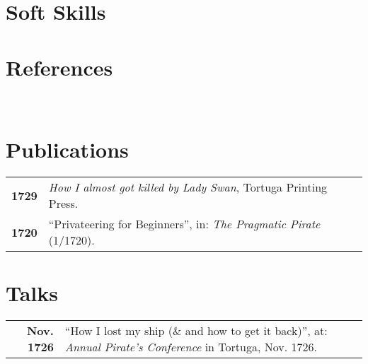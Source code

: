 \documentclass[AdrianConfig]{hipstercv}
\begin{document}
\begin{paracol}{2}
\begin{minipage}[t]{0.3\textwidth}
\section*{Soft Skills}
\section*{References}
 \\

\end{minipage}\hfill
\begin{minipage}[t]{0.3\textwidth}
\section*{Publications}
\begin{tabular}{>{\footnotesize\bfseries}r >{\footnotesize}p{}}
    1729 & \emph{How I almost got killed by Lady Swan}, Tortuga Printing Press. \\
    1720 & ``Privateering for Beginners'', in: \emph{The Pragmatic Pirate} (1/1720).
\end{tabular}
\section*{Talks}
\begin{tabular}{>{\footnotesize\bfseries}r >{\footnotesize}p{}}
    Nov. 1726 & ``How I lost my ship (\& and how to get it back)'', at: \emph{Annual Pirate's Conference} in Tortuga, Nov. 1726.
\end{tabular}
\end{minipage}


\end{paracol}
\end{document}
